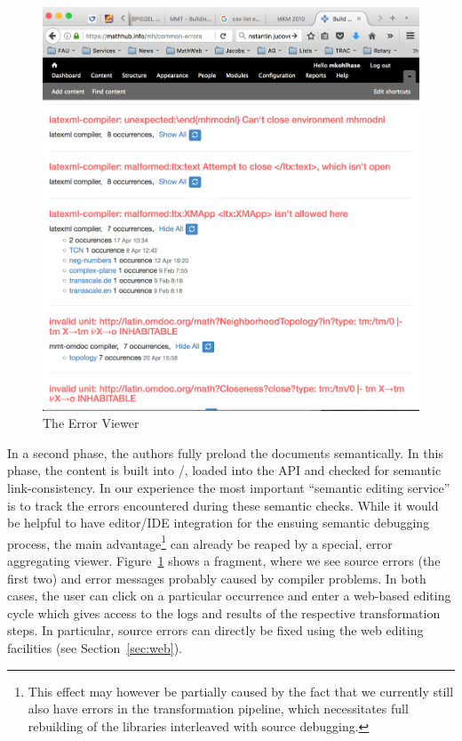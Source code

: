 \begin{figure}[ht]\centering
  \includegraphics[width=\textwidth]{errorview}
  \caption{The \sys Error Viewer}\label{fig:errorview}
\end{figure}

In a second phase, the authors fully preload the documents semantically. In this phase,
the content is built into \omdoc/\mmt, loaded into the \mmt API and checked for semantic
link-consistency. In our experience the most important ``semantic editing service'' is to
track the errors encountered during these semantic checks. While it would be helpful to
have editor/IDE integration for the ensuing semantic debugging process, the main
advantage\footnote{This effect may however be partially caused by the fact that we
  currently still also have errors in the transformation pipeline, which necessitates full
  rebuilding of the \sys libraries interleaved with source debugging.}  can already be
reaped by a special, error aggregating viewer.  Figure~\ref{fig:errorview} shows a
fragment, where we see source errors (the first two) and error messages probably caused by
compiler problems. In both cases, the user can click on a particular occurrence and
enter a web-based editing cycle which gives access to the logs and results of the
respective transformation steps. In particular, source errors can directly be fixed using the web
editing facilities (see Section~\ref{sec:web}).

